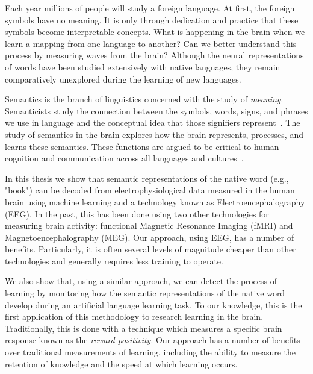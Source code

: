 \label{chapter:introduction}

Each year millions of people will study a foreign language. At first, the 
foreign symbols have no meaning. It is only through dedication and practice 
that these symbols become interpretable concepts. What is happening in the 
brain when we learn a mapping from one language to another? Can we better 
understand this process by measuring waves from the brain? Although the neural 
representations of words have been studied extensively with native languages,
they remain comparatively unexplored during the learning of new languages.
 
Semantics is the branch of linguistics concerned with the study of 
\emph{meaning}. Semanticists study the connection between the symbols, words, 
signs, and phrases we use in language and the conceptual idea that those 
signifiers represent~\cite{kreidler2002introducing}. The study of semantics in 
the brain explores how the brain represents, processes, and learns these 
semantics. These functions are argued to be critical to human cognition and 
communication across all languages and cultures~\cite{croft2004cognitive}.

In this thesis we show that semantic representations of the native word (e.g.,
"book") can be decoded from electrophysiological data measured in the human 
brain using machine learning and a technology known as Electroencephalography 
(EEG).  In the past, this has been done using two other technologies for 
measuring brain activity: functional Magnetic Resonance Imaging (fMRI) and 
Magnetoencephalography (MEG).  Our approach, using EEG, has a number of 
benefits. Particularly, it is often several levels of magnitude cheaper than 
other technologies and generally requires less training to operate.

We also show that, using a similar approach, we can detect the process of 
learning by monitoring how the semantic representations of the native word 
develop during an artificial language learning task. To our knowledge, this is 
the first application of this methodology to research learning in the brain.  
Traditionally, this is done with a technique which measures a specific brain 
response known as the \emph{reward positivity}. Our approach has a number of 
benefits over traditional measurements of learning, including the ability to 
measure the retention of knowledge and the speed at which learning occurs.






